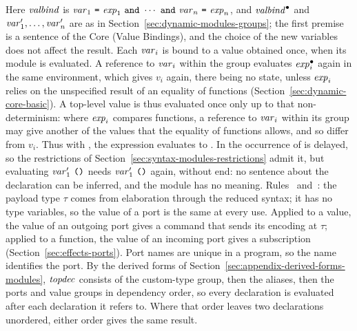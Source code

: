 \begin{rulecomments}
 Here $\mathit{valbind}$ is
$\var_1\ \kw{=}\ \expm_1\ \kw{and}\ \cdots\ \kw{and}\ \var_n\ \kw{=}\ \expm_n$,
and $\mathit{valbind}^{\bullet}$ and $\mathit{var}'_1,\ldots,\mathit{var}'_n$ are as in
Section~\ref{sec:dynamic-modules-groups}; the first premise is a sentence of
the Core (Value Bindings), and the choice of the new variables does not affect
the result. Each $\mathit{var}_i$ is bound to a value obtained once, when its module
is evaluated. %
A reference to $\mathit{var}_i$ within the group evaluates $\mathit{exp}_i^{\bullet}$ again
in the same environment, which gives $v_i$ again, there being no state,
unless $\mathit{exp}_i$ relies on the unspecified result of an equality of functions
(Section~\ref{sec:dynamic-core-basic}). A top-level value is thus evaluated
once only up to that non-determinism: where $\mathit{exp}_i$ compares functions, a
reference to $\mathit{var}_i$ within its group may give another of the values that
the equality of functions allows, and so differ from $v_i$. %
Thus with
, the expression
 evaluates to .
In  the occurrence of  is delayed, so the
restrictions of Section~\ref{sec:syntax-modules-restrictions} admit it, but
evaluating $\var'_1\ \kw{()}$ needs $\var'_1\ \kw{()}$ again, without end: no
sentence about the declaration can be inferred, and the module has no
meaning. %
 Rules~
and~: the payload type $\tau$ comes from
elaboration through the reduced syntax; it has no type variables, so the
value of a port is the same at every use. Applied to a value, the value of an
outgoing port gives a command that sends its encoding at $\tau$; applied to a
function, the value of an incoming port gives a subscription
(Section~\ref{sec:effects-ports}). Port names are unique in a program, so the
name identifies the port. %
 By the derived forms of
Section~\ref{sec:appendix-derived-forms-modules}, $\mathit{topdec}$ consists of the
custom-type group, then the aliases, then the ports and value groups in
dependency order, so every declaration is evaluated after each declaration
it refers to. Where that order leaves two declarations unordered, either
order gives the same result.
\end{rulecomments}

